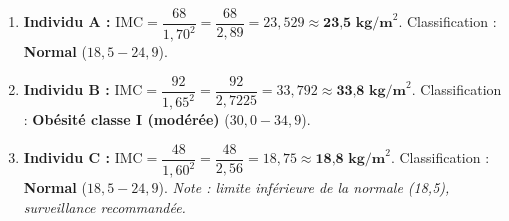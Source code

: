 \documentclass[11pt]{article}
\begin{document}
\begin{corrige}
\begin{enumerate}
    \item \textbf{Individu A :} $\text{IMC} = \dfrac{68}{1,70^2} = \dfrac{68}{2,89} = 23,529 \approx \textbf{23,5 kg/m}^2$. \quad Classification : \textbf{Normal} ($18,5 - 24,9$).
    \item \textbf{Individu B :} $\text{IMC} = \dfrac{92}{1,65^2} = \dfrac{92}{2,7225} = 33,792 \approx \textbf{33,8 kg/m}^2$. \quad Classification : \textbf{Obésité classe I (modérée)} ($30,0 - 34,9$).
    \item \textbf{Individu C :} $\text{IMC} = \dfrac{48}{1,60^2} = \dfrac{48}{2,56} = 18,75 \approx \textbf{18,8 kg/m}^2$. \quad Classification : \textbf{Normal} ($18,5 - 24,9$). \textit{Note : limite inférieure de la normale (18,5), surveillance recommandée.}
\end{enumerate}
\end{corrige}
\end{document}
